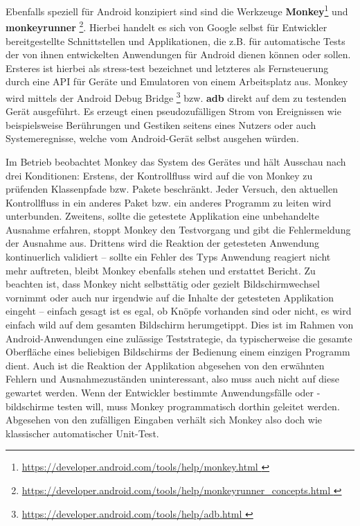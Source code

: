 Ebenfalls speziell für Android konzipiert sind sind die Werkzeuge
\textbf{Monkey}\footnote{ \url{ https://developer.android.com/tools/help/monkey.html }}
und \textbf{monkeyrunner}
\footnote{ \url{ https://developer.android.com/tools/help/monkeyrunner_concepts.html }}.
Hierbei handelt es sich von Google selbst für Entwickler bereitgestellte
Schnittstellen und Applikationen, die z.B. für automatische Tests 
der von ihnen entwickelten Anwendungen für Android dienen können oder sollen.
Ersteres ist hierbei als \glqq{}stress-test\grqq{} bezeichnet und letzteres
als \glqq{}Fernsteuerung durch eine API für Geräte und Emulatoren von 
einem Arbeitsplatz aus\grqq{}. Monkey wird mittels der Android Debug Bridge
\footnote{ \url{ https://developer.android.com/tools/help/adb.html }}
bzw. \textbf{adb} direkt auf dem zu testenden Gerät ausgeführt. Es erzeugt
einen pseudozufälligen Strom von Ereignissen wie beispielsweise
Berührungen und Gestiken seitens eines Nutzers oder auch Systemeregnisse,
welche vom Android-Gerät selbst ausgehen würden.

Im Betrieb beobachtet Monkey das System
des Gerätes und hält Ausschau nach drei Konditionen: Erstens, der
Kontrollfluss wird auf die von Monkey zu prüfenden Klassenpfade bzw.
Pakete beschränkt. Jeder Versuch, den aktuellen Kontrollfluss in ein
anderes Paket bzw. ein anderes Programm zu leiten wird unterbunden.
Zweitens, sollte die getestete Applikation eine unbehandelte Ausnahme
erfahren, stoppt Monkey den Testvorgang und gibt die Fehlermeldung der
Ausnahme aus. Drittens wird die Reaktion der getesteten Anwendung
kontinuerlich validiert -- sollte ein Fehler des Typs \glqq{}Anwendung
reagiert nicht mehr\grqq{} auftreten, bleibt Monkey ebenfalls stehen
und erstattet Bericht. Zu beachten ist, dass Monkey nicht selbsttätig
oder gezielt Bildschirmwechsel vornimmt oder auch nur irgendwie
auf die Inhalte der getesteten Applikation eingeht -- einfach gesagt ist es egal,
ob Knöpfe vorhanden sind oder nicht, es wird einfach wild auf dem
gesamten Bildschirm herumgetippt. Dies ist im Rahmen von Android-Anwendungen
eine zulässige Teststrategie, da typischerweise die gesamte Oberfläche
eines beliebigen Bildschirms der Bedienung einem einzigen Programm dient.
Auch ist die Reaktion der Applikation abgesehen von den erwähnten
Fehlern und Ausnahmezuständen uninteressant, also muss auch nicht auf
diese gewartet werden. Wenn der Entwickler bestimmte Anwendungsfälle
oder -bildschirme testen will, muss Monkey programmatisch dorthin
geleitet werden. Abgesehen von den zufälligen Eingaben verhält sich
Monkey also doch wie klassischer automatischer Unit-Test.


